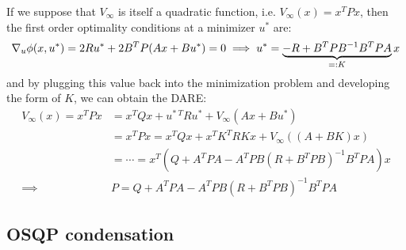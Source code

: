 \documentclass[12pt]{article}
\begin{document}
If we suppose that $V_\infty$ is itself a quadratic function, i.e. $V_\infty(x)=x^TPx$, then the first order optimality conditions at a minimizer $u^*$ are:
$$\nabla_u\phi(x,u^*)=2Ru^*+2B^TP(Ax+Bu^*)=0\implies u^*=\underbrace{-R+B^TPB^{-1}B^TPA}_{=:K}x$$
and by plugging this value back into the minimization problem and developing the form of $K$, we can obtain the DARE:
\begin{align*}
	V_\infty(x)=x^TPx&=x^TQx+u^{*~T}Ru^*+V_\infty(Ax+Bu^*)\\
	&=x^TPx=x^TQx +x^TK^TRKx+V_\infty((A+BK)x)\\
	&=\cdots=x^T(Q+A^TPA-A^TPB(R+B^TPB)^{-1}B^TPA)x\\
	\implies&\boxed{P=Q+A^TPA-A^TPB(R+B^TPB)^{-1}B^TPA}
\end{align*}


\subsection{OSQP condensation}\label{sec:osqp-condensation}
\end{document}
